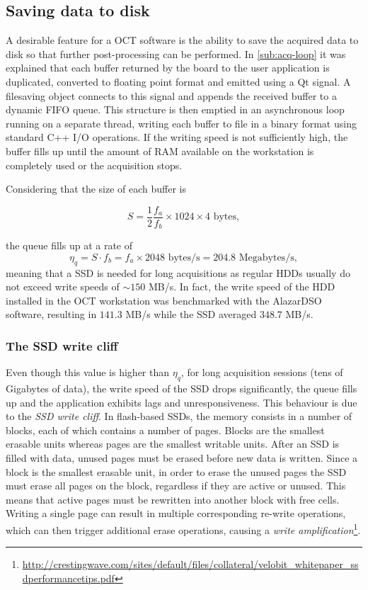 \subsection{Saving data to disk}
A desirable feature for a OCT software is the ability to save the acquired data to disk so that further post-processing can be performed. In \autoref{sub:acq-loop} it was explained that each buffer returned by the board to the user application is duplicated, converted to floating point format and emitted using a Qt signal. A filesaving object connects to this signal and appends the received buffer to a dynamic FIFO queue. This structure is then emptied in an asynchronous loop running on a separate thread, writing each buffer to file in a binary format using standard C++ I/O operations. If the writing speed is not sufficiently high, the buffer fills up until the amount of \ac{RAM} available on the workstation is completely used or the acquisition stops. 

Considering that the size of each buffer is

\begin{equation}
	S = \frac{1}{2} \frac{f_a}{f_b} \times 1024 \times 4 \text{ bytes},
\end{equation}

the queue fills up at a rate of
\begin{equation}
\eta_{q} = S \cdot f_b = f_a \times 2048\text{ bytes/s} = 204.8\text{ Megabytes/s},
\end{equation}
meaning that a \ac{SSD} is needed for long acquisitions as regular \acp{HDD} usually do not exceed write speeds of $\sim 150$ MB/s. In fact, the write speed of the HDD installed in the OCT workstation was benchmarked with the AlazarDSO software, resulting in $141.3$ MB/s while the SSD averaged $348.7$ MB/s. 

\subsubsection{The SSD write cliff}
Even though this value is higher than $\eta_q$, for long acquisition sessions (tens of Gigabytes of data), the write speed of the SSD drops significantly, the queue fills up and the application exhibits lags and unresponsiveness. This behaviour is due to the \emph{SSD write cliff}. In flash-based SSDs, the memory consists in a number of blocks, each of which contains a number of pages. Blocks are the smallest erasable units whereas pages are the smallest writable units. After an SSD is filled with data, unused pages must be erased before new data is written. Since a block is the smallest erasable unit, in order to erase the unused pages the SSD must erase all pages on the block, regardless if they are active or unused. This means that active pages must be rewritten into another block with free cells. Writing a single page can result in multiple corresponding re-write operations, which can then trigger additional erase operations, causing a \emph{write amplification}\footnote{\url{http://crestingwave.com/sites/default/files/collateral/velobit_whitepaper_ssdperformancetips.pdf}}. 

